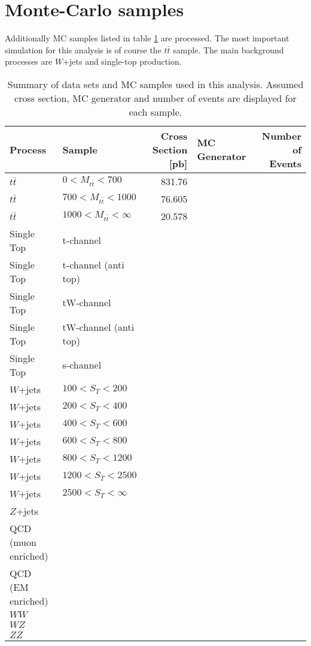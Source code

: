 	\section{Monte-Carlo samples}
	Additionally MC samples listed in table \ref{MC_Tab} are processed. The most important simulation for this analysis is of course the $t\bar{t}$ sample. The main background processes are $W$+jets and single-top production.
	\begin{landscape}
	\begin{table}
	\centering
	 \begin{tabular}{|l|l|r|l|r|}
	 	\hline
	 	Process & Sample & Cross Section [pb] & MC Generator & Number of Events \\
	 	\hline
	 	$t\bar{t}$ & $0 < M_{t\bar{t}} < 700$ & 831.76 & & \\
	 	$t\bar{t}$ & $700 < M_{t\bar{t}} < 1000$ & 76.605 & & \\
	 	$t\bar{t}$ & $1000 < M_{t\bar{t}} < \infty$ & 20.578 & & \\
	 	\hline
		Single Top &t-channel  & & & \\
		Single Top & t-channel (anti top) & & & \\
		Single Top & tW-channel & & & \\
		Single Top & tW-channel (anti top) & & & \\
		Single Top & s-channel & & & \\
		$W$+jets & $100 < S_T < 200$ & & & \\
	 	$W$+jets & $200 < S_T < 400$ & & & \\
	 	$W$+jets & $400 < S_T < 600$ & & & \\
	 	$W$+jets & $600 < S_T < 800$ & & & \\
	 	$W$+jets & $800 < S_T < 1200$ & & & \\
	 	$W$+jets & $1200 < S_T < 2500$ & & & \\
	 	$W$+jets & $2500 < S_T < \infty$ & & & \\
	 	$Z$+jets & & & & \\
	 	QCD (muon enriched) & & & & \\
	 	QCD (EM enriched) & & & & \\
	 	$WW$& & & & \\
	 	$WZ$& & & & \\
	 	$ZZ$& & & & \\
	 	 \hline
	 \end{tabular}
	\caption{Summary of data sets and MC samples used in this analysis. Assumed cross section, MC generator and number of events are displayed for each sample.}
	\label{MC_Tab}	
	\end{table}
	\end{landscape}